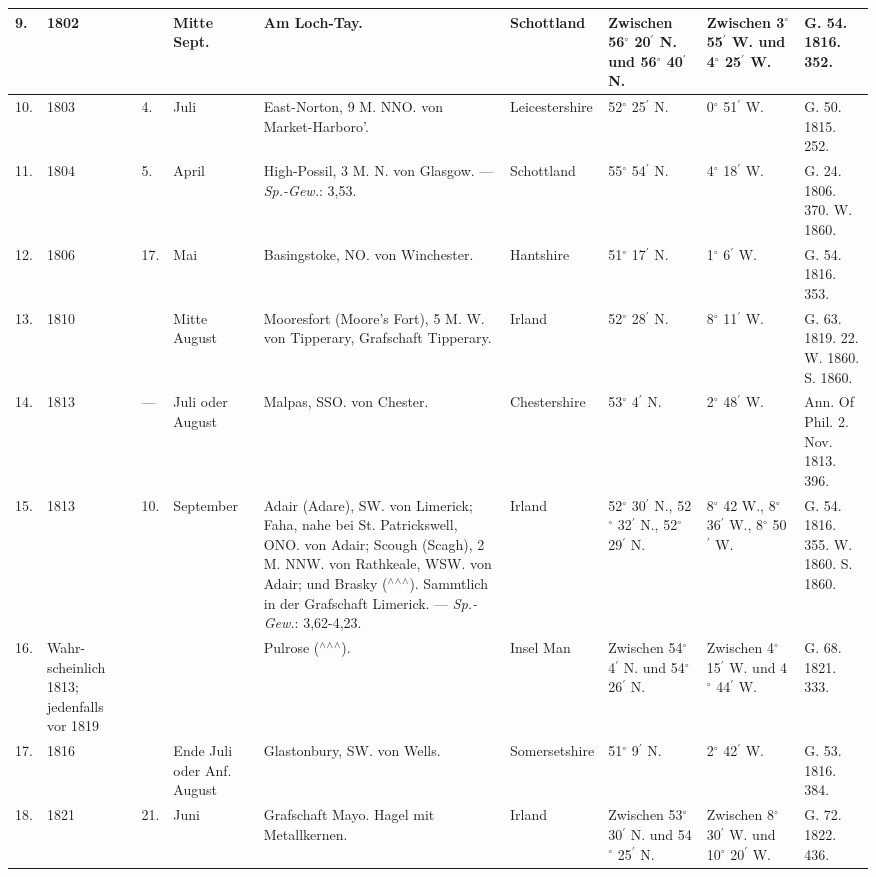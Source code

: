 \documentclass[a4paper, 8pt, oneside, polutonikogreek, german]{article}
\begin{document}
\begin{center}
\begin{longtable}{|p{3mm}|p{10mm}|p{3mm}|p{15mm}|p{30mm}|p{25mm}|p{13mm}|p{13mm}|p{13mm}|}
        9. & 1802 & ~ & Mitte Sept. & Am Loch-Tay. & Schottland & Zwischen 56$^\circ$ 20$^\prime$ N. und 56$^\circ$ 40$^\prime$ N. & Zwischen 3$^\circ$ 55$^\prime$ W. und 4$^\circ$ 25$^\prime$ W. & G. 54. 1816. 352. \\ \hline
        10. & 1803 & 4. & Juli & East-Norton, 9 M. NNO. von Market-Harboro’. & Leicestershire & 52$^\circ$ 25$^\prime$ N. & 0$^\circ$ 51$^\prime$ W. & G. 50. 1815. 252. \\ \hline
        11. & 1804 & 5. & April & High-Possil, 3 M. N. von Glasgow. --- \emph{Sp.-Gew.}: 3,53. & Schottland & 55$^\circ$ 54$^\prime$ N. & 4$^\circ$ 18$^\prime$ W. & G. 24. 1806. 370. W. 1860. \\ \hline
        12. & 1806 & 17. & Mai & Basingstoke, NO. von Winchester. & Hantshire & 51$^\circ$ 17$^\prime$ N. & 1$^\circ$ 6$^\prime$ W. & G. 54. 1816. 353. \\ \hline
        13. & 1810 & ~ & Mitte August & Mooresfort (Moore’s Fort), 5 M. W. von Tipperary, Grafschaft Tipperary. & Irland & 52$^\circ$ 28$^\prime$ N. & 8$^\circ$ 11$^\prime$ W. & G. 63. 1819. 22. W. 1860. S. 1860. \\ \hline
        14. & 1813 & --- & Juli oder August & Malpas, SSO. von Chester. & Chestershire & 53$^\circ$ 4$^\prime$ N. & 2$^\circ$ 48$^\prime$ W. & Ann. Of Phil. 2. Nov. 1813. 396. \\ \hline
        15. & 1813 & 10. & September & Adair (Adare), SW. von Limerick; Faha, nahe bei St. Patrickswell, ONO. von Adair; Scough (Scagh), 2 M. NNW. von Rathkeale, WSW. von Adair; und Brasky ($^\wedge$$^\wedge$$^\wedge$). Sammtlich in der Grafschaft Limerick. --- \emph{Sp.-Gew.}: 3,62-4,23. & Irland & 52$^\circ$ 30$^\prime$ N., 52$^\circ$ 32$^\prime$ N., 52$^\circ$ 29$^\prime$ N. & 8$^\circ$ 42 W., 8$^\circ$ 36$^\prime$ W., 8$^\circ$ 50$^\prime$ W. & G. 54. 1816. 355. W. 1860. S. 1860. \\ \hline
        16. & Wahr- scheinlich 1813; jedenfalls vor 1819 & ~ & ~ & Pulrose ($^\wedge$$^\wedge$$^\wedge$). & Insel Man & Zwischen 54$^\circ$ 4$^\prime$ N. und 54$^\circ$ 26$^\prime$ N. & Zwischen 4$^\circ$ 15$^\prime$ W. und 4$^\circ$ 44$^\prime$ W. & G. 68. 1821. 333. \\ \hline
        17. & 1816 & ~ & Ende Juli oder Anf. August & Glastonbury, SW. von Wells. & Somersetshire & 51$^\circ$ 9$^\prime$ N. & 2$^\circ$ 42$^\prime$ W. & G. 53. 1816. 384. \\ \hline        
        18. & 1821 & 21. & Juni & Grafschaft Mayo. Hagel mit Metallkernen. & Irland & Zwischen 53$^\circ$ 30$^\prime$ N. und 54$^\circ$ 25$^\prime$ N. & Zwischen 8$^\circ$ 30$^\prime$ W. und 10$^\circ$ 20$^\prime$ W. & G. 72. 1822. 436. \\ \hline

\end{longtable}
\end{center}
\end{document}
